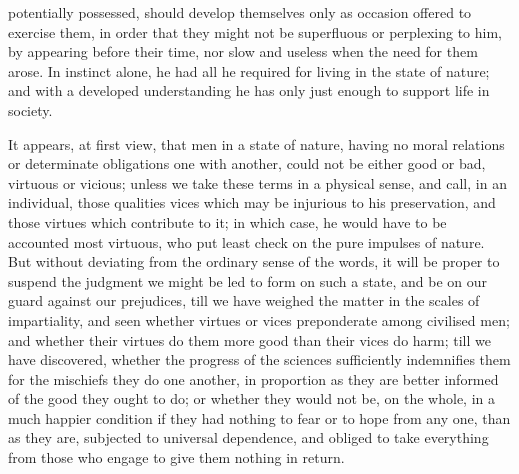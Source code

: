 \documentclass[12pt]{report}
\begin{document}
potentially possessed, should develop themselves only as occasion offered to exercise them, in order that they might not be superfluous or perplexing to him, by appearing before their time, nor slow and useless when the need for them arose. In instinct alone, he had all he required for living in the state of nature; and with a developed understanding he has only just enough to support life in society.

It appears, at first view, that men in a state of nature, having no moral relations or determinate obligations one with another, could not be either good or bad, virtuous or vicious; unless we take these terms in a physical sense, and call, in an individual, those qualities vices which may be injurious to his preservation, and those virtues which contribute to it; in which case, he would have to be accounted most virtuous, who put least check on the pure impulses of nature. But without deviating from the ordinary sense of the words, it will be proper to suspend the judgment we might be led to form on such a state, and be on our guard against our prejudices, till we have weighed the matter in the scales of impartiality, and seen whether virtues or vices preponderate among civilised men; and whether their virtues do them more good than their vices do harm; till we have discovered, whether the progress of the sciences sufficiently indemnifies them for the mischiefs they do one another, in proportion as they are better informed of the good they ought to do; or whether they would not be, on the whole, in a much happier condition if they had nothing to fear or to hope from any one, than as they are, subjected to universal dependence, and obliged to take everything from those who engage to give them nothing in return.
\end{document}
